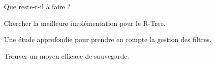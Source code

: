\documentclass[frames,pdf,slideColor,colorBG,accumulate,total]{prosper}
\begin{document}

\begin{slide}[Box]{Que reste-t-il à faire ?}
    \vspace{1cm}
    \begin{Itemize}
    \item Chercher la meilleure implémentation pour le R-Tree.
    \item Une étude approfondie pour prendre en compte la gestion des filtres.
    \item Trouver un moyen efficace de sauvegarde.
    \end{Itemize}
  \end{slide}

 
\end{document}
